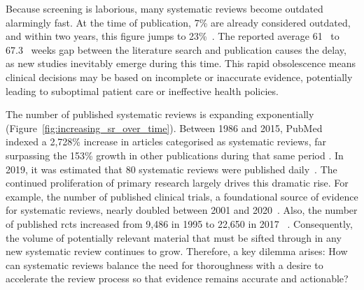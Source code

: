 \documentclass[10pt,oneside]{book}
\begin{document}
Because screening is laborious, many systematic reviews become outdated alarmingly fast. At the time of publication, 7\% are already considered outdated, and within two years, this figure jumps to 23\%~\cite{shojania_how_2007}. The reported average 61~\cite{sampson_surveillance_2008} to 67.3~\cite{borah_analysis_2017} weeks gap between the literature search and publication causes the delay, as new studies inevitably emerge during this time. This rapid obsolescence means clinical decisions may be based on incomplete or inaccurate evidence, potentially leading to suboptimal patient care or ineffective health policies. 

The number of published systematic reviews is expanding exponentially (Figure~\ref{fig:increasing_sr_over_time}). Between 1986 and 2015, PubMed indexed a 2{,}728\% increase in articles categorised as systematic reviews, far surpassing the 153\% growth in other publications during that same period \cite{ioannidis_mass_2016}. In 2019, it was estimated that 80 systematic reviews were published daily~\cite{hoffmann_nearly_2021}. The continued proliferation of primary research largely drives this dramatic rise. For example, the number of published clinical trials, a foundational source of evidence for systematic reviews, nearly doubled between 2001 and 2020~\cite{ghasemi_scientific_2022}. Also, the number of published \glspl*{rct} increased from 9{,}486 in 1995 to 22{,}650 in 2017 ~\cite{niforatos_assessment_2019}. Consequently, the volume of potentially relevant material that must be sifted through in any new systematic review continues to grow. Therefore, a key dilemma arises: How can systematic reviews balance the need for thoroughness with a desire to accelerate the review process so that evidence remains accurate and actionable?
\end{document}
